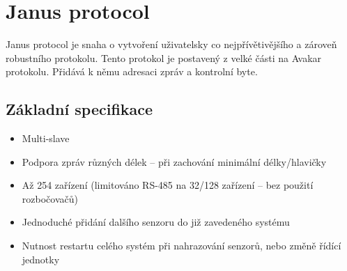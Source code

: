 \chapter{Janus protocol}
Janus protocol je snaha o vytvoření uživatelsky co nejpřívětivějšího a zároveň robustního protokolu.
Tento protokol je postavený z velké části na Avakar protokolu.
Přidává k němu adresaci zpráv a kontrolní byte.

\section{Základní specifikace}
\begin{itemize}
    \item Multi-slave
    \item Podpora zpráv různých délek -- při zachování minimální délky/hlavičky
    \item Až 254 zařízení (limitováno RS-485 na 32/128 zařízení -- bez použití rozbočovačů)
    \item Jednoduché přidání dalšího senzoru do již zavedeného systému
    \item Nutnost restartu celého systém při nahrazování senzorů, nebo změně řídící jednotky
\end{itemize}